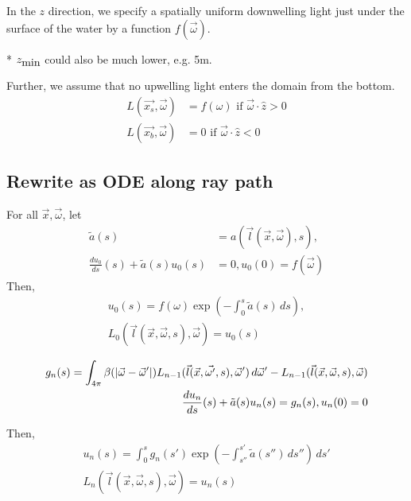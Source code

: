 In the $z$ direction, we specify a spatially uniform downwelling light just
under the surface of the water by a function $f(\vec{\omega})$.

* $z_{\mbox{min}}$ could also be much lower, e.g. 5m.

Further, we assume that no upwelling light enters the domain from the bottom.
\begin{align}
  L(\vec{x_s}, \vec{\omega}) &= f(\omega) \mbox{ if } \vec{\omega} \cdot \hat{z} > 0\\ 
  L(\vec{x_b}, \vec{\omega}) &= 0 \mbox { if } \vec{\omega} \cdot \hat{z} < 0
\end{align}
 
\subsection{Rewrite as ODE along ray path}
For all $\vec{x}, \vec{\omega}$, let
\begin{align}
  \tilde{a}(s) &= a(\vec{l}(\vec{x}, \vec{\omega}), s), \\ 
  \frac{du_0}{ds}(s) + \tilde{a}(s) u_0(s) &= 0, u_0(0) = f(\vec{\omega})
\end{align}
Then,
\begin{align}
  u_0(s) = f(\omega) \exp\left(-\int_0^s \tilde{a}(s)\, ds\right), \\
  L_0(\vec{l}(\vec{x}, \vec{\omega},s), \vec{\omega}) = u_0(s)
\end{align}

\begin{align}
  g_n(s) = \int_{4\pi} \beta(\left| \vec{\omega} - \vec{\omega}' \right|)
  L_{n-1}(\vec{l}(\vec{x}, \vec{\omega'}, s), \vec{\omega}')\,d\vec{\omega}' - L_{n-1}(\vec{l}(\vec{x}, \vec{\omega}, s), \vec{\omega}) \\ 
  \frac{du_n}{ds}(s) + \tilde{a}(s)u_n(s) = g_n(s), u_n(0) = 0
\end{align}

Then,
\begin{align}
  u_n(s) = \int_0^sg_n(s')\exp\left( -\int_{s''}^{s'}\tilde{a}(s'')\,ds'' \right)\, ds' \\
  L_n(\vec{l}(\vec{x}, \vec{\omega}, s), \vec{\omega}) = u_n(s)
\end{align}
